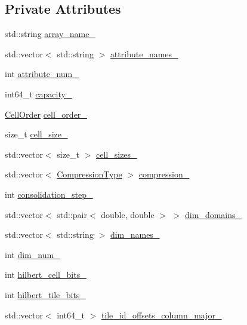 \subsection*{Private Attributes}
\begin{DoxyCompactItemize}
\item 
std\+::string \hyperlink{classArraySchema_aa30b1f9b3be749d5c5c72c3c44b57bc4}{array\+\_\+name\+\_\+}
\item 
std\+::vector$<$ std\+::string $>$ \hyperlink{classArraySchema_ac7b21b43f42638db785c039dcaefa184}{attribute\+\_\+names\+\_\+}
\item 
int \hyperlink{classArraySchema_a4b51afed85b1d0d79ad2f2365d9d5c1c}{attribute\+\_\+num\+\_\+}
\item 
int64\+\_\+t \hyperlink{classArraySchema_a9b38e7051d7c1cb5f3bcedf850439c29}{capacity\+\_\+}
\item 
\hyperlink{classArraySchema_a847601130253f905337b5e284e1b78f2}{Cell\+Order} \hyperlink{classArraySchema_af067d28d340153d911fe3252d100588d}{cell\+\_\+order\+\_\+}
\item 
size\+\_\+t \hyperlink{classArraySchema_a1dc5a12c70b7101ed06e23d9c4ed35c6}{cell\+\_\+size\+\_\+}
\item 
std\+::vector$<$ size\+\_\+t $>$ \hyperlink{classArraySchema_a0ec47aa5b59bd1d738aecb57ec57fac5}{cell\+\_\+sizes\+\_\+}
\item 
std\+::vector$<$ \hyperlink{classArraySchema_a167615fb84dd6124ab2dac0dbbf35d46}{Compression\+Type} $>$ \hyperlink{classArraySchema_a7ac8416f05a69e7b0d154e0d2c16733b}{compression\+\_\+}
\item 
int \hyperlink{classArraySchema_aa04ac8362f27d541057201dc78a78dc1}{consolidation\+\_\+step\+\_\+}
\item 
std\+::vector$<$ std\+::pair$<$ double, double $>$ $>$ \hyperlink{classArraySchema_ad345538fc45d45b1cbc47f8601679115}{dim\+\_\+domains\+\_\+}
\item 
std\+::vector$<$ std\+::string $>$ \hyperlink{classArraySchema_a2727572d5457356c8ca2c0d3690fe19a}{dim\+\_\+names\+\_\+}
\item 
int \hyperlink{classArraySchema_a3759dcfaf3620ccc7de8920a6f512a84}{dim\+\_\+num\+\_\+}
\item 
int \hyperlink{classArraySchema_ad568c55fb480e4f11fd5fe44e5facbb1}{hilbert\+\_\+cell\+\_\+bits\+\_\+}
\item 
int \hyperlink{classArraySchema_ab72cae879b11642bc812ca7e6f185bb7}{hilbert\+\_\+tile\+\_\+bits\+\_\+}
\item 
std\+::vector$<$ int64\+\_\+t $>$ \hyperlink{classArraySchema_a50e07e36d0fc5a08b61ddb18819492a0}{tile\+\_\+id\+\_\+offsets\+\_\+column\+\_\+major\+\_\+}

\end{DoxyCompactItemize}
